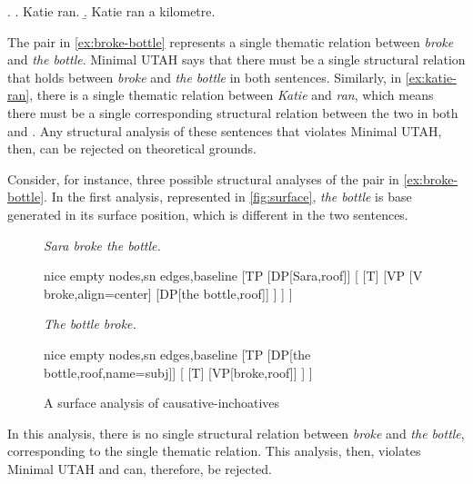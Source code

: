 \ex. \label{ex:katie-ran}
\a. Katie ran.
\b. Katie ran a kilometre.

The pair in \ref{ex:broke-bottle} represents a single thematic relation between \textit{broke} and \textit{the bottle}.
Minimal UTAH says that there must be a single structural relation that holds between \textit{broke} and \textit{the bottle} in both sentences.
Similarly, in \ref{ex:katie-ran}, there is a single thematic relation between \textit{Katie} and \textit{ran}, which means there must be a single corresponding structural relation between the two in both \Last[a] and \Last[b].
Any structural analysis of these sentences that violates Minimal UTAH, then, can be rejected on theoretical grounds.

Consider, for instance, three possible structural analyses of the pair in \ref{ex:broke-bottle}.
In the first analysis, represented in \autoref{fig:surface}, \textit{the bottle} is base generated in its surface position, which is different in the two sentences.
\begin{figure}[h]
	\centering
	\begin{minipage}[t]{.45\textwidth}
		\textit{Sara broke the bottle.}\\
		\begin{forest}
		  nice empty nodes,sn edges,baseline
		  [TP
		    [DP[Sara,roof]]
		    [
		      [T]
		      [VP
			[V\\broke,align=center]
			[DP[the bottle,roof]]
		      ]
		    ]
		  ]
		\end{forest}	
	\end{minipage}
	\begin{minipage}[t]{0.45\textwidth}
	\textit{The bottle broke.}\\
		\begin{forest}
		  nice empty nodes,sn edges,baseline
		  [TP
		    [DP[the bottle,roof,name=subj]]
		    [
		      [T]
		      [VP[broke,roof]]
		    ]
		  ]
		\end{forest}	
	\end{minipage}
	\caption{A surface analysis of causative-inchoatives}
	\label{fig:surface}
\end{figure}
In this analysis, there is no single structural relation between \textit{broke} and \textit{the bottle}, corresponding to the single thematic relation.
This analysis, then, violates Minimal UTAH and can, therefore, be rejected.

